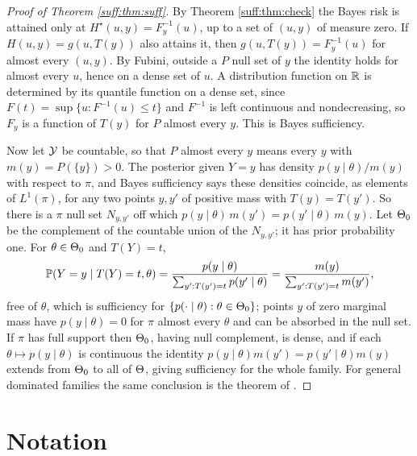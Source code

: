 \begin{proof}[Proof of Theorem \ref{suff:thm:suff}]
By Theorem \ref{suff:thm:check} the Bayes risk is attained only at $H^\star(u,y)=F^{-1}_y(u)$,
up to a set of $(u,y)$ of measure zero. If $H(u,y)=g(u,T(y))$ also attains it, then
$g(u,T(y)) = F^{-1}_y(u)$ for almost every $(u,y)$. By Fubini, outside a $P$ null set of $y$
the identity holds for almost every $u$, hence on a dense set of $u$. A distribution function
on $\mathbb{R}$ is determined by its quantile function on a dense set, since $F(t)=\sup\{u:F^{-1}(u)\le
t\}$ and $F^{-1}$ is left continuous and nondecreasing, so $F_y$ is a function of $T(y)$ for
$P$ almost every $y$. This is Bayes sufficiency.

Now let $\mathcal{Y}$ be countable, so that $P$ almost every $y$ means every $y$ with $m(y)=P(\{y\})>0$.
The posterior given $Y=y$ has density $p(y\mid\theta)/m(y)$ with respect to $\pi$, and Bayes
sufficiency says these densities coincide, as elements of $L^1(\pi)$, for any two points $y,y'$
of positive mass with $T(y)=T(y')$. So there is a $\pi$ null set $N_{y,y'}$ off which
$p(y\mid\theta)\,m(y')=p(y'\mid\theta)\,m(y)$. Let $\Theta_0$ be the complement of the countable
union of the $N_{y,y'}$; it has prior probability one. For $\theta\in\Theta_0$ and $T(Y)=t$,
\[
\mathbb{P}(Y=y\mid T(Y)=t,\theta)=\frac{p(y\mid\theta)}{\sum_{y':T(y')=t}p(y'\mid\theta)}
=\frac{m(y)}{\sum_{y':T(y')=t}m(y')},
\]
free of $\theta$, which is sufficiency for $\{p(\cdot\mid\theta):\theta\in\Theta_0\}$; points
$y$ of zero marginal mass have $p(y\mid\theta)=0$ for $\pi$ almost every $\theta$ and can be
absorbed in the null set. If $\pi$ has full support then $\Theta_0$, having null complement, is
dense, and if each $\theta\mapsto p(y\mid\theta)$ is continuous the identity
$p(y\mid\theta)m(y')=p(y'\mid\theta)m(y)$ extends from $\Theta_0$ to all of $\Theta$, giving
sufficiency for the whole family. For general dominated families the same conclusion is the
theorem of \citet{suff:halmossavage1949}.
\end{proof}

\section{Notation}
\label{suff:app:notation2}

